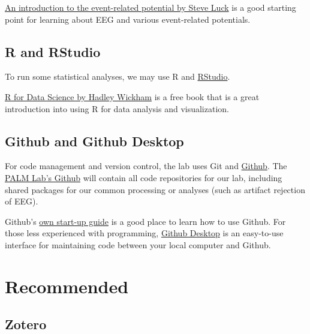 \documentclass[
]{book}
\begin{document}
\href{https://mitpress.mit.edu/9780262525855/an-introduction-to-the-event-related-potential-technique/}{An introduction to the event-related potential by Steve Luck} is a good starting point for learning about EEG and various event-related potentials.

\hypertarget{r-and-rstudio}{%
\subsection*{R and RStudio}\label{r-and-rstudio}}

To run some statistical analyses, we may use R and \href{https://posit.co/download/rstudio-desktop/}{RStudio}.

\href{https://r4ds.hadley.nz/}{R for Data Science by Hadley Wickham} is a free book that is a great introduction into using R for data analysis and visualization.

\hypertarget{github-and-github-desktop}{%
\subsection*{Github and Github Desktop}\label{github-and-github-desktop}}

For code management and version control, the lab uses Git and \href{https://github.com}{Github}. The \href{https://github.com/PALM-Lab}{PALM Lab's Github} will contain all code repositories for our lab, including shared packages for our common processing or analyses (such as artifact rejection of EEG).

Github's \href{https://docs.github.com/en/get-started/quickstart/hello-world}{own start-up guide} is a good place to learn how to use Github. For those less experienced with programming, \href{https://desktop.github.com/}{Github Desktop} is an easy-to-use interface for maintaining code between your local computer and Github.

\hypertarget{recommended}{%
\section{Recommended}\label{recommended}}

\hypertarget{zotero}{%
\subsection*{Zotero}\label{zotero}}
\end{document}
